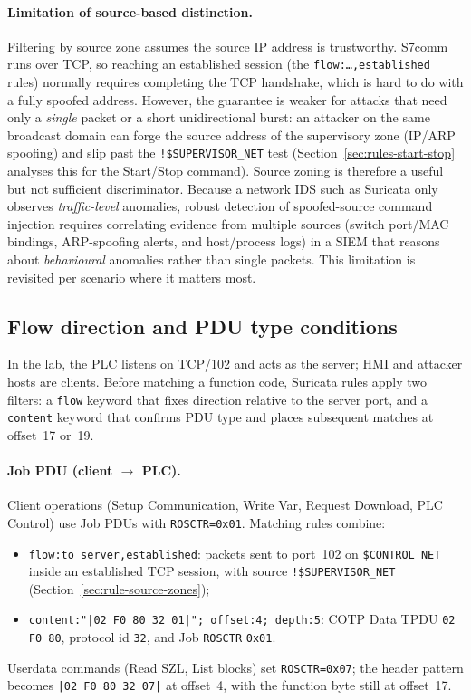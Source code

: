 \documentclass[../main.tex]{subfiles}
\begin{document}
\paragraph{Limitation of source-based distinction.}
Filtering by source zone assumes the source IP address is trustworthy. S7comm runs over TCP, so reaching an established session (the \texttt{flow:\dots,established} rules) normally requires completing the TCP handshake, which is hard to do with a fully spoofed address. However, the guarantee is weaker for attacks that need only a \emph{single} packet or a short unidirectional burst: an attacker on the same broadcast domain can forge the source address of the supervisory zone (IP/ARP spoofing) and slip past the \texttt{!\$SUPERVISOR\_NET} test (Section~\ref{sec:rules-start-stop} analyses this for the Start/Stop command). Source zoning is therefore a useful but not sufficient discriminator. Because a network IDS such as Suricata only observes \emph{traffic-level} anomalies, robust detection of spoofed-source command injection requires correlating evidence from multiple sources (switch port/MAC bindings, ARP-spoofing alerts, and host/process logs) in a SIEM that reasons about \emph{behavioural} anomalies rather than single packets. This limitation is revisited per scenario where it matters most.

\subsection{Flow direction and PDU type conditions}
\label{sec:rule-flow-pdu}

In the lab, the PLC listens on TCP/102 and acts as the server; HMI and attacker hosts are clients. Before matching a function code, Suricata rules apply two filters: a \texttt{flow} keyword that fixes direction relative to the server port, and a \texttt{content} keyword that confirms PDU type and places subsequent matches at offset~17 or~19.

\paragraph{Job PDU (client $\rightarrow$ PLC).}
Client operations (Setup Communication, Write Var, Request Download, PLC Control) use Job PDUs with \texttt{ROSCTR=0x01}. Matching rules combine:
\begin{itemize}
    \item \texttt{flow:to\_server,established}: packets sent to port~102 on \texttt{\$CONTROL\_NET} inside an established TCP session, with source \texttt{!\$SUPERVISOR\_NET} (Section~\ref{sec:rule-source-zones});
    \item \texttt{content:"|02 F0 80 32 01|"; offset:4; depth:5}: COTP Data TPDU \texttt{02 F0 80}, protocol id \texttt{32}, and Job \texttt{ROSCTR} \texttt{0x01}.
\end{itemize}
Userdata commands (Read SZL, List blocks) set \texttt{ROSCTR=0x07}; the header pattern becomes \texttt{|02 F0 80 32 07|} at offset~4, with the function byte still at offset~17.
\end{document}
